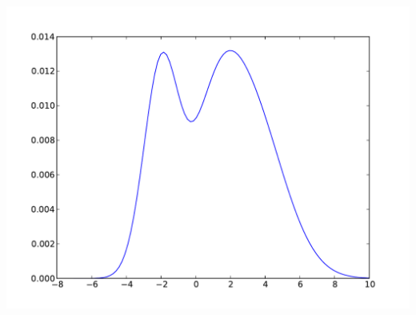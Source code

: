 \documentclass[solution, letterpaper]{cs121}
\begin{document}
\begin{empfile}
\subproblem %

  \includegraphics[width=170mm]{mixture_o_gaussians.pdf}



\end{empfile}

\immediate{}
\end{document}
